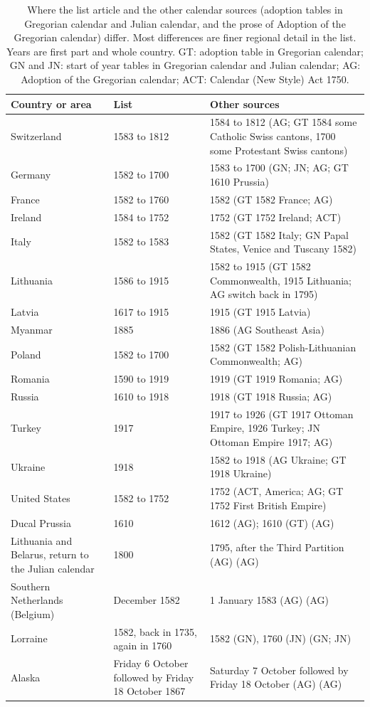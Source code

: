 \documentclass[11pt,a4paper]{article}
\begin{document}
\begin{table}[tbp]\centering\footnotesize\caption{Where the list article and the other calendar sources (adoption tables in Gregorian calendar and Julian calendar, and the prose of Adoption of the Gregorian calendar) differ. Most differences are finer regional detail in the list. Years are first part and whole country. GT: adoption table in Gregorian calendar; GN and JN: start of year tables in Gregorian calendar and Julian calendar; AG: Adoption of the Gregorian calendar; ACT: Calendar (New Style) Act 1750.}\label{tab:dis}\begin{tabular}{p{4.2cm}p{4.4cm}p{5.6cm}}\toprule Country or area & List & Other sources\\\midrule
Switzerland & 1583 to 1812 & 1584 to 1812 (AG; GT 1584 some Catholic Swiss cantons, 1700 some Protestant Swiss cantons)\\
Germany & 1582 to 1700 & 1583 to 1700 (GN; JN; AG; GT 1610 Prussia)\\
France & 1582 to 1760 & 1582 (GT 1582 France; AG)\\
Ireland & 1584 to 1752 & 1752 (GT 1752 Ireland; ACT)\\
Italy & 1582 to 1583 & 1582 (GT 1582 Italy; GN Papal States, Venice and Tuscany 1582)\\
Lithuania & 1586 to 1915 & 1582 to 1915 (GT 1582 Commonwealth, 1915 Lithuania; AG switch back in 1795)\\
Latvia & 1617 to 1915 & 1915 (GT 1915 Latvia)\\
Myanmar & 1885 & 1886 (AG Southeast Asia)\\
Poland & 1582 to 1700 & 1582 (GT 1582 Polish-Lithuanian Commonwealth; AG)\\
Romania & 1590 to 1919 & 1919 (GT 1919 Romania; AG)\\
Russia & 1610 to 1918 & 1918 (GT 1918 Russia; AG)\\
Turkey & 1917 & 1917 to 1926 (GT 1917 Ottoman Empire, 1926 Turkey; JN Ottoman Empire 1917; AG)\\
Ukraine & 1918 & 1582 to 1918 (AG Ukraine; GT 1918 Ukraine)\\
United States & 1582 to 1752 & 1752 (ACT, America; AG; GT 1752 First British Empire)\\
Ducal Prussia & 1610 & 1612 (AG); 1610 (GT) (AG)\\
Lithuania and Belarus, return to the Julian calendar & 1800 & 1795, after the Third Partition (AG) (AG)\\
Southern Netherlands (Belgium) & December 1582 & 1 January 1583 (AG) (AG)\\
Lorraine & 1582, back in 1735, again in 1760 & 1582 (GN), 1760 (JN) (GN; JN)\\
Alaska & Friday 6 October followed by Friday 18 October 1867 & Saturday 7 October followed by Friday 18 October (AG) (AG)\\
\bottomrule\end{tabular}\end{table}
\end{document}
